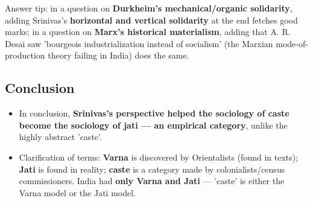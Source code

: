 \begin{ExampleBox}
Answer tip: in a question on \textbf{Durkheim's mechanical/organic solidarity}, adding Srinivas's \textbf{horizontal and vertical solidarity} at the end fetches good marks; in a question on \textbf{Marx's historical materialism}, adding that A. R. Desai saw 'bourgeois industrialization instead of socialism' (the Marxian mode-of-production theory failing in India) does the same.
\end{ExampleBox}

\subsection{Conclusion}

\begin{KeyConcept}
\begin{itemize}
\item In conclusion, \textbf{Srinivas's perspective helped the sociology of caste become the sociology of jati --- an empirical category}, unlike the highly abstract 'caste'.
\item Clarification of terms: \textbf{Varna} is discovered by Orientalists (found in texts); \textbf{Jati} is found in reality; \textbf{caste} is a category made by colonialists/census commissioners. India had \textbf{only Varna and Jati} --- 'caste' is either the Varna model or the Jati model.
\end{itemize}
\end{KeyConcept}

